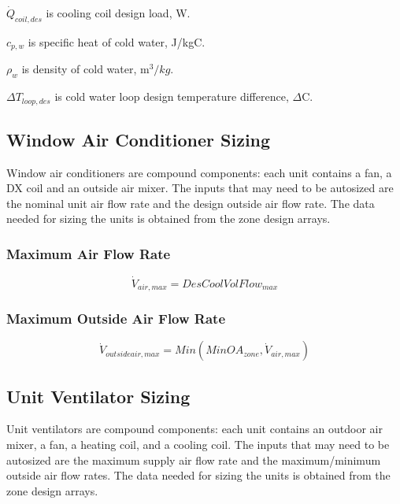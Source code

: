 \(\dot{Q}_{coil,des}\) is cooling coil design load, W.

\(c_{p,w}\) is specific heat of cold water, J/kgC.

\(\rho_{w}\) is density of cold water, m$^{3}/kg$.

\(\Delta T_{loop,des}\) is cold water loop design temperature difference, \(\Delta\)C.

\subsection{Window Air Conditioner Sizing}\label{window-air-conditioner-sizing}

Window air conditioners are compound components: each unit contains a fan, a DX coil and an outside air mixer. The inputs that may need to be autosized are the nominal unit air flow rate and the design outside air flow rate. The data needed for sizing the units is obtained from the zone design arrays.

\subsubsection{Maximum Air Flow Rate}\label{maximum-air-flow-rate-1}

\begin{equation}
{\dot V_{air,max}} = DesCoolVolFlo{w_{max}}
\end{equation}

\subsubsection{Maximum Outside Air Flow Rate}\label{maximum-outside-air-flow-rate-1}

\begin{equation}
\dot V_{outsideair,max} = Min(MinOA_{zone},\dot V_{air,max})
\end{equation}

\subsection{Unit Ventilator Sizing}\label{unit-ventilator-sizing}

Unit ventilators are compound components: each unit contains an outdoor air mixer, a fan, a heating coil, and a cooling coil. The inputs that may need to be autosized are the maximum supply air flow rate and the maximum/minimum outside air flow rates. The data needed for sizing the units is obtained from the zone design arrays.

